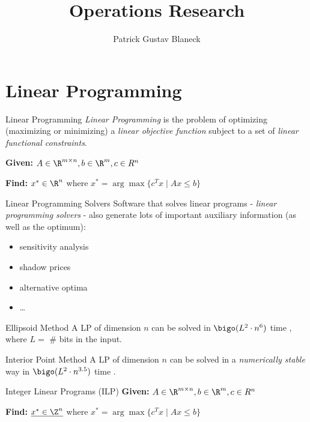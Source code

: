\documentclass[english]{../spicker}
\title{Operations Research}
\author{Patrick Gustav Blaneck}
\begin{document}
\maketitle
\tableofcontents
\newpage


\section{Linear Programming}

\begin{defi}{Linear Programming}
    \emph{Linear Programming} is the problem of optimizing (maximizing or minimizing) a \emph{linear objective function} subject to a set of \emph{linear functional constraints}.

    \textbf{Given:} $A \in \R^{m\times n}, b \in \R^m, c\in R^n$

    \textbf{Find:} $x^* \in \R^n$ where $x^* = \arg\max\{c^Tx \mid Ax \leq b\}$
\end{defi}

\begin{bonus}{Linear Programming Solvers}
    Software that solves linear programs - \emph{linear programming solvers} - also generate lots of important auxiliary information (as well as the optimum):
    \begin{itemize}
        \item sensitivity analysis
        \item shadow prices
        \item alternative optima
        \item \ldots
    \end{itemize}
\end{bonus}

\begin{theo}{Ellipsoid Method}
    A LP of dimension $n$ can be solved in $\bigo(L^2 \cdot n^6)$ time \cite{khachiyan1979}, where $L =$ \# bits in the input.
\end{theo}

\begin{theo}{Interior Point Method}
    A LP of dimension $n$ can be solved in a \emph{numerically stable} way in $\bigo(L^2 \cdot n^{3.5})$ time \cite{karmarkar1984}.
\end{theo}

\begin{defi}{Integer Linear Programs (ILP)}
    \textbf{Given:} $A \in \R^{m\times n}, b \in \R^m, c\in R^n$

    \textbf{Find:} $\underline{x^*\in\Z^n}$ where $x^* = \arg\max\{c^Tx \mid Ax \leq b\}$
\end{defi}
\end{document}
